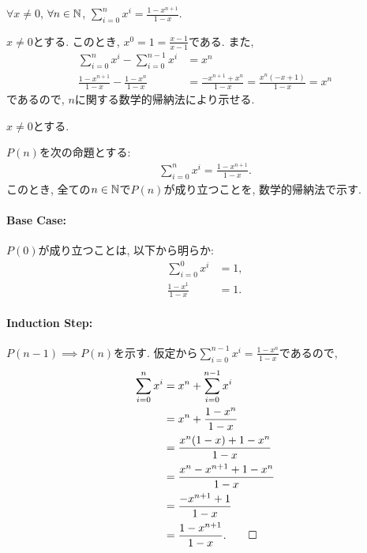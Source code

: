 \begin{prop}
  \label{p:20230720}
  $\forall x\neq 0$,
  $\forall n\in\mathbb{N}$,
  $\sum_{i=0}^{n}x^i=\frac{1-x^{n+1}}{1-x}$.
\end{prop}

\begin{proof**}
  $x\neq 0$とする.
  このとき,
  $x^0=1=\frac{x-1}{x-1}$である.
  また,
  \begin{align*}
    \sum_{i=0}^{n}x^i-\sum_{i=0}^{n-1}x^i&=x^n\\
    \frac{1-x^{n+1}}{1-x}-\frac{1-x^{n}}{1-x}
    &=\frac{-x^{n+1}+x^n}{1-x}
    =\frac{x^n(-x+1)}{1-x}
    =x^n
  \end{align*}
  であるので,
  $n$に関する数学的帰納法により示せる.
\end{proof**}

\begin{proof*}
  $x\neq 0$とする.
  
  $P(n)$を次の命題とする:
  \begin{align*}
    \sum_{i=0}^{n}x^i=\frac{1-x^{n+1}}{1-x}.
  \end{align*}
  このとき,
  全ての$n\in\mathbb{N}$で$P(n)$が成り立つことを,
  数学的帰納法で示す.

  \paragraph{Base Case:}
  $P(0)$が成り立つことは, 以下から明らか:
  \begin{align*}
    \sum_{i=0}^0 x^i&=1,\\
    \frac{1-x^1}{1-x}&=1.
  \end{align*}

  \paragraph{Induction Step:}
  $P(n-1)\implies P(n)$を示す.
  仮定から$    \sum_{i=0}^{n-1}x^i=\frac{1-x^{n}}{1-x}$であるので,
  \begin{align*}
    \sum_{i=0}^{n}x^i
    &=x^n+\sum_{i=0}^{n-1}x^i\\
    &=x^n+\frac{1-x^{n}}{1-x}\\
    &=\frac{x^n(1-x)+1-x^{n}}{1-x}\\
    &=\frac{x^n-x^{n+1}+1-x^{n}}{1-x}\\
    &=\frac{-x^{n+1}+1}{1-x}\\
    &=\frac{1-x^{n+1}}{1-x}
    .\qedhere
  \end{align*}
\end{proof*}

